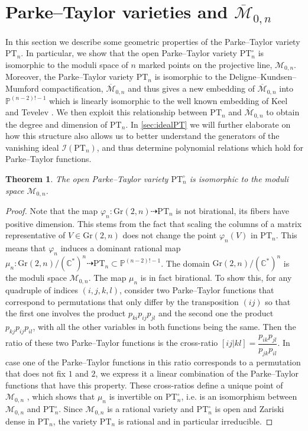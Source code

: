\documentclass[12pt, reqno]{amsart}
\numberwithin{equation}{section}
\theoremstyle{plain}
\newtheorem{theorem}{Theorem}[section]
\theoremstyle{definition}
\newcommand{\pp}{\mathbb{P}}
\newcommand{\cm}{\mathcal{M}}
\newcommand{\ci}{\mathcal{I}}
\newcommand{\monbar}{\overline{\mathcal{M}}_{0, n}}
\newcommand{\pt}{\mathrm{PT}}
\begin{document}
\section{Parke--Taylor varieties and $\monbar$} \label{sec:PTM0n}
In this section we describe some geometric properties of the Parke--Taylor variety $\mathrm{PT}_n$. In particular, we show that the open Parke--Taylor variety $\pt_n^\circ$ is isomorphic to the moduli space of $n$ marked points on the projective line, $\cm_{0,n}$. Moreover, the Parke--Taylor variety $\pt_n$ is isomorphic to the Deligne--Kundsen--Mumford compactification, $\monbar$ and thus gives a new embedding of $\monbar$ into $\pp^{(n-2)! - 1}$ which is linearly isomorphic to the well known embedding of Keel and Tevelev \cite{keel2009equations}.
We then exploit this relationship between $\pt_n$ and $\monbar$ to obtain the degree and dimension of $\pt_n$. In \cref{sec:idealPT} we will further elaborate on how this structure also allows us to better understand the generators of the vanishing ideal $\ci(\pt_n)$, and thus determine polynomial relations which hold for Parke--Taylor functions. 

\newpage

\begin{theorem} \label{thm:PTM0n}
    The open Parke--Taylor variety $\mathrm{PT}^\circ_n$ is isomorphic to the moduli space $\mathcal{M}_{0,n}$. 
\end{theorem}

\begin{proof}
    Note that the map $\varphi_n: \mathrm{Gr}(2,n)\dashrightarrow \mathrm{PT}_n$ is not birational, its fibers have positive dimension. This stems from the fact that scaling the columns of a matrix representative of $V\in\mathrm{Gr}(2,n)$ does not change the point $\varphi_n(V)$ in $\mathrm{PT}_n$. This means that $\varphi_n$ induces a dominant rational map $\mu_n: \mathrm{Gr}(2,n)/(\mathbb{C}^*)^n\dashrightarrow \mathrm{PT}_n\subset \mathbb{P}^{(n-2)!-1}$. The domain $\mathrm{Gr}(2,n)/(\mathbb{C}^*)^n$ is the moduli space $\mathcal{M}_{0,n}$. The map $\mu_n$ is in fact birational. To show this, for any quadruple of indices $(i,j,k,l)$, consider two Parke--Taylor functions that correspond to permutations that only differ by the transposition $(ij)$ so that the first one involves the product $p_{ki}p_{ij}p_{jl}$ and the second one the product $p_{kj}p_{ij}p_{il}$, with all the other variables in both functions being the same. Then the ratio of these two Parke--Taylor functions is the cross-ratio $[ij|kl]=\dfrac{p_{ik}p_{jl}}{p_{jk}p_{il}}$. In case one of the Parke--Taylor functions in this ratio corresponds to a permutation that does not fix $1$ and $2$, we express it a linear combination of the Parke--Taylor functions that have this property. These cross-ratios define a unique point of $\mathcal{M}_{0,n}$ \cite[Proposition 1.6]{lam2024moduli}, which shows that $\mu_n$ is invertible on $\mathrm{PT}^\circ_n$, i.e. is an isomorphism between $\mathcal{M}_{0,n}$ and $\mathrm{PT}^\circ_n$. Since $\mathcal{M}_{0,n}$ is a rational variety and $\mathrm{PT}^\circ_n$ is open and Zariski dense in $\mathrm{PT}_n$, the variety $\mathrm{PT}_n$ is rational and in particular irreducible. 
\end{proof}
\end{document}
